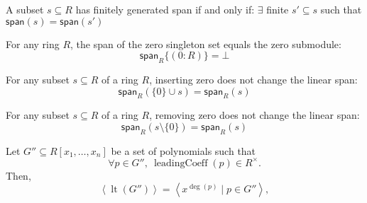         \begin{lemma}\label{fg_span_iff_fg_span_finset_subset}
          
          
          A subset $s \subseteq R$ has finitely generated span if and only if:
$\exists$ finite $s' \subseteq s$ such that $\mathsf{span}(s) = \mathsf{span}(s')$

        \end{lemma}

        \begin{lemma}\label{span_singleton_zero}
          
          \leanok
          For any ring \( R \), the span of the zero singleton set equals the zero submodule:
\[
  \mathsf{span}_R \{(0 : R)\} = \bot
\]

        \end{lemma}

        \begin{lemma}\label{span_insert_zero}
          
          \leanok
          For any subset $s \subseteq R$ of a ring $R$, inserting zero does not change the linear span:
\[
  \mathsf{span}_R(\{0\} \cup s) = \mathsf{span}_R(s)
\]

        \end{lemma}

        \begin{lemma}\label{Ideal.span_sdiff_singleton_zero}
          \leanok
          For any subset $s \subseteq R$ of a ring $R$, removing zero does not change the linear span:
\[
  \mathsf{span}_R(s \setminus \{0\}) = \mathsf{span}_R(s)
\]

        \end{lemma}

        \begin{lemma}\label{leadingTerm_ideal_span_monomial}
          \leanok
          Let \( G'' \subseteq R[x_1, \dots, x_n] \) be a set of polynomials such that
\[
\forall p \in G'',\ \operatorname{leadingCoeff}(p) \in R^\times.
\]
Then,
\[
\left\langle \operatorname{lt}(G'') \right\rangle = \left\langle x^{\deg(p)} \mid p \in G'' \right\rangle,
\]

        \end{lemma}

